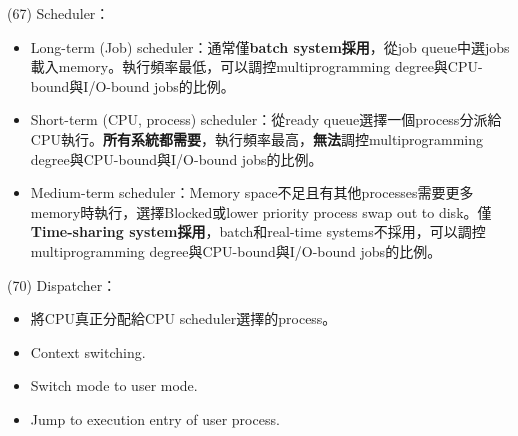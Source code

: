 \begin{theorem}{(67)} Scheduler：\begin{itemize}
        \item Long-term (Job) scheduler：通常僅\textbf{batch system採用}，從job queue中選jobs載入memory。執行頻率最低，可以調控multiprogramming degree與CPU-bound與I/O-bound jobs的比例。
        \item Short-term (CPU, process) scheduler：從ready queue選擇一個process分派給CPU執行。\textbf{所有系統都需要}，執行頻率最高，\textbf{無法}調控multiprogramming degree與CPU-bound與I/O-bound jobs的比例。
        \item Medium-term scheduler：Memory space不足且有其他processes需要更多memory時執行，選擇Blocked或lower priority process swap out to disk。僅\textbf{Time-sharing system採用}，batch和real-time systems不採用，可以調控multiprogramming degree與CPU-bound與I/O-bound jobs的比例。
    \end{itemize}
\end{theorem}

\begin{theorem}{(70)} Dispatcher： \begin{itemize}
        \item 將CPU真正分配給CPU scheduler選擇的process。
        \item Context switching.
        \item Switch mode to user mode.
        \item Jump to execution entry of user process.
    \end{itemize}
\end{theorem}


